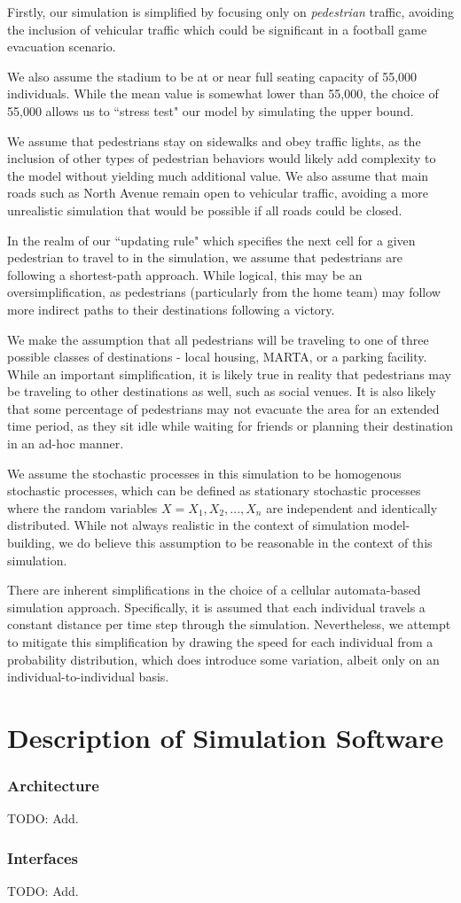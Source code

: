 \documentclass[12pt]{article}
\begin{document}
Firstly, our simulation is simplified by focusing only on
\textit{pedestrian} traffic, avoiding the inclusion of vehicular traffic which
could be significant in a football game evacuation scenario.

We also assume the stadium to be at or near full seating capacity of 55,000
individuals. While the mean value is somewhat lower than 55,000, the choice
of 55,000 allows us to ``stress test" our model by simulating the upper bound.

We assume that pedestrians stay on sidewalks and obey traffic lights, as the
inclusion of other types of pedestrian behaviors would likely add complexity
to the model without yielding much additional value. We also assume that main
roads such as North Avenue remain open to vehicular traffic, avoiding a more
unrealistic simulation that would be possible if all roads could be closed.

In the realm of our “updating rule" which specifies the next cell for a given
pedestrian to travel to in the simulation, we assume that pedestrians are
following a shortest-path approach. While logical, this may be an
oversimplification, as pedestrians (particularly from the home team) may follow
more indirect paths to their destinations following a victory.

We make the assumption that all pedestrians will be traveling to one of three
possible classes of destinations - local housing, MARTA, or a parking facility.
While an important simplification, it is likely true in reality that pedestrians
may be traveling to other destinations as well, such as social venues. It is
also likely that some percentage of pedestrians may not evacuate the area for
an extended time period, as they sit idle while waiting for friends or planning
their destination in an ad-hoc manner.

We assume the stochastic processes in this simulation to be homogenous
stochastic processes, which can be defined as stationary stochastic processes
where the random variables $X = X_1, X_2, ..., X_n$ are independent and
identically distributed. While not always realistic in the context of
simulation model-building, we do believe this assumption to be reasonable in
the context of this simulation.

There are inherent simplifications in the choice of a cellular automata-based
simulation approach. Specifically, it is assumed that each individual travels
a constant distance per time step through the simulation. Nevertheless, we
attempt to mitigate this simplification by drawing the speed for each
individual from a probability distribution, which does introduce some
variation, albeit only on an individual-to-individual basis.

\section{Description of Simulation Software}

\subsubsection{Architecture}
TODO: Add.

\subsubsection{Interfaces}
TODO: Add.

{}

\end{document}
